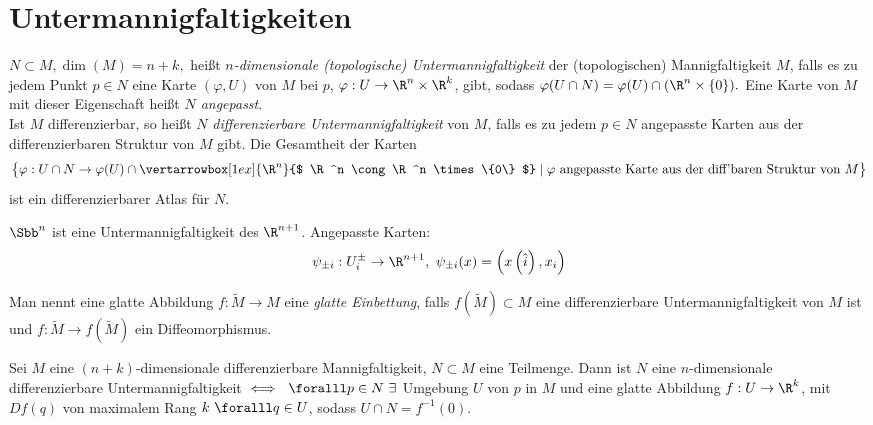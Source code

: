 \section{Untermannigfaltigkeiten}

\begin{defn}
	$ N \subset M, \dim(M) = n+k, $ heißt \emph{$n$-dimensionale (topologische) Untermannigfaltigkeit} der (topologischen) Mannigfaltigkeit $M$, falls es zu jedem Punkt $p \in N$ eine Karte $ (\varphi,U)$ von $M$ bei $p$, $ \varphi: U \to \R^n \times \R^k $, gibt, sodass $ \varphi(U \cap N) = \varphi(U) \cap (\R^n \times \{0\}). $ Eine Karte von $M$ mit dieser Eigenschaft heißt \emph{$N$ angepasst}.\\
	Ist $M$ differenzierbar, so heißt $N$ \emph{differenzierbare Untermannigfaltigkeit} von $M$, falls es zu jedem $p \in N$ angepasste Karten aus der differenzierbaren Struktur von $M$ gibt. Die Gesamtheit der Karten 
	$$ \big\{ \varphi: U \cap N \to \varphi(U) \cap \vertarrowbox[1ex]{\R^n}{$ \R^n \cong \R^n \times \{0\} $} \mid \varphi\ \text{angepasste Karte aus der diff'baren Struktur von } M \big\} $$
	ist ein differenzierbarer Atlas für $N$.
	\begin{exmp*}
		$ \Sbb^n $ ist eine Untermannigfaltigkeit des $\R^{n+1}$. Angepasste Karten:
		\[ \psi_{\pm i}: U_i^\pm \to \R^{n+1},\ \psi_{\pm i}(x) = \left( x \left( \hat{i} \right),x_i \right) \]
	\end{exmp*}
	Man nennt eine glatte Abbildung $ f: \tilde{M} \to M $ eine \emph{glatte Einbettung}, falls $ f\left( \tilde{M} \right) \subset M $ eine differenzierbare Untermannigfaltigkeit von $M$ ist und $ f: \tilde{M} \to f\left( \tilde{M} \right) $ ein Diffeomorphismus.
\end{defn}

\begin{thm}
	Sei $M$ eine $(n+k)$-dimensionale differenzierbare Mannigfaltigkeit, $ N \subset M$ eine Teilmenge. Dann ist $N$ eine $n$-dimensionale differenzierbare Untermannigfaltigkeit $ \iff \ \foralll p \in N \ \exists $ Umgebung $U$ von $p$ in $M$ und eine glatte Abbildung $ f: U \to \R^k$, mit $ Df(q) $ von maximalem Rang $k\ \foralll q \in U$, sodass $ U \cap N = f^{-1}(0). $
\end{thm}

